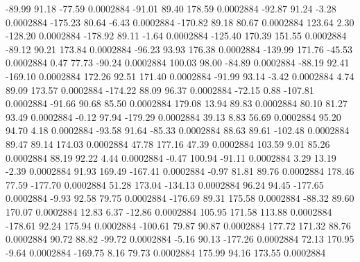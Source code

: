       -89.99       91.18      -77.59     0.0002884
      -91.01       89.40      178.59     0.0002884
      -92.87       91.24       -3.28     0.0002884
     -175.23       80.64       -6.43     0.0002884
     -170.82       89.18       80.67     0.0002884
      123.64        2.30     -128.20     0.0002884
     -178.92       89.11       -1.64     0.0002884
     -125.40      170.39      151.55     0.0002884
      -89.12       90.21      173.84     0.0002884
      -96.23       93.93      176.38     0.0002884
     -139.99      171.76      -45.53     0.0002884
        0.47       77.73      -90.24     0.0002884
      100.03       98.00      -84.89     0.0002884
      -88.19       92.41     -169.10     0.0002884
      172.26       92.51      171.40     0.0002884
      -91.99       93.14       -3.42     0.0002884
        4.74       89.09      173.57     0.0002884
     -174.22       88.09       96.37     0.0002884
      -72.15        0.88     -107.81     0.0002884
      -91.66       90.68       85.50     0.0002884
      179.08       13.94       89.83     0.0002884
       80.10       81.27       93.49     0.0002884
       -0.12       97.94     -179.29     0.0002884
       39.13        8.83       56.69     0.0002884
       95.20       94.70        4.18     0.0002884
      -93.58       91.64      -85.33     0.0002884
       88.63       89.61     -102.48     0.0002884
       89.47       89.14      174.03     0.0002884
       47.78      177.16       47.39     0.0002884
      103.59        9.01       85.26     0.0002884
       88.19       92.22        4.44     0.0002884
       -0.47      100.94      -91.11     0.0002884
        3.29       13.19       -2.39     0.0002884
       91.93      169.49     -167.41     0.0002884
       -0.97       81.81       89.76     0.0002884
      178.46       77.59     -177.70     0.0002884
       51.28      173.04     -134.13     0.0002884
       96.24       94.45     -177.65     0.0002884
       -9.93       92.58       79.75     0.0002884
     -176.69       89.31      175.58     0.0002884
      -88.32       89.60      170.07     0.0002884
       12.83        6.37      -12.86     0.0002884
      105.95      171.58      113.88     0.0002884
     -178.61       92.24      175.94     0.0002884
     -100.61       79.87       90.87     0.0002884
      177.72      171.32       88.76     0.0002884
       90.72       88.82      -99.72     0.0002884
       -5.16       90.13     -177.26     0.0002884
       72.13      170.95       -9.64     0.0002884
     -169.75        8.16       79.73     0.0002884
      175.99       94.16      173.55     0.0002884

